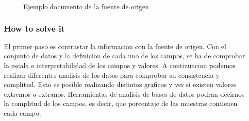 \begin{figure}[ht]
\centering
{}
\caption{Ejemplo documento de la fuente de origen}
\end{figure}
\begin{comment}
    
\end{co}
\begin{itemize}

    \item Informacion precisa
    \item Datos contrastados
\end{itemize}
\end{comment}


\subsubsection{How to solve it} 
El primer paso es contrastar la informacion con la fuente de origen. Con el conjunto de datos y la definicion
de cada uno de los campos, se ha de comprobar la escala e interpretabilidad de los campos y valores.
A continuacion podemos realizar diferentes analisis de los datos para comprobar su consistencia y complitud. Esto 
es posible realizando distintos graficos y ver si existen valores extremos o extranos.
Herramientas de analisis de bases de datos podran decirnos la complitud de los campos, es decir, que porcentaje de las
muestras contienen cada campo.

